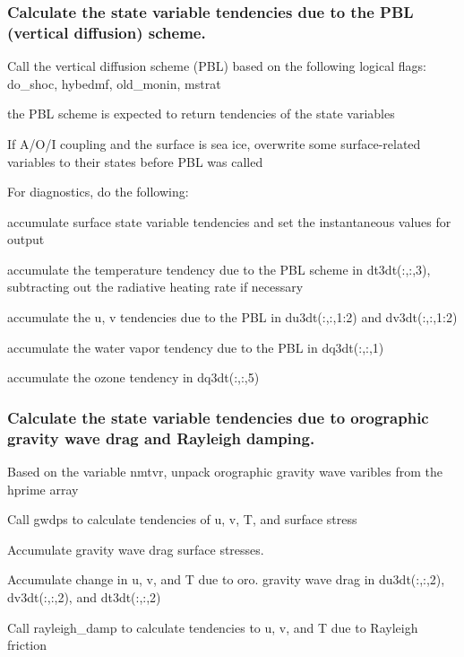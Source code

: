 \subsubsection*{Calculate the state variable tendencies due to the P\+BL (vertical diffusion) scheme.}


\begin{DoxyItemize}
\item Call the vertical diffusion scheme (P\+BL) based on the following logical flags\+: do\+\_\+shoc, hybedmf, old\+\_\+monin, mstrat
\begin{DoxyItemize}
\item the P\+BL scheme is expected to return tendencies of the state variables
\end{DoxyItemize}
\item If A/\+O/I coupling and the surface is sea ice, overwrite some surface-\/related variables to their states before P\+BL was called
\item For diagnostics, do the following\+:
\begin{DoxyItemize}
\item accumulate surface state variable tendencies and set the instantaneous values for output
\item accumulate the temperature tendency due to the P\+BL scheme in dt3dt(\+:,\+:,3), subtracting out the radiative heating rate if necessary
\item accumulate the u, v tendencies due to the P\+BL in du3dt(\+:,\+:,1\+:2) and dv3dt(\+:,\+:,1\+:2)
\item accumulate the water vapor tendency due to the P\+BL in dq3dt(\+:,\+:,1)
\item accumulate the ozone tendency in dq3dt(\+:,\+:,5)
\end{DoxyItemize}
\end{DoxyItemize}

\subsubsection*{Calculate the state variable tendencies due to orographic gravity wave drag and Rayleigh damping.}


\begin{DoxyItemize}
\item Based on the variable nmtvr, unpack orographic gravity wave varibles from the hprime array
\item Call \textquotesingle{}gwdps\textquotesingle{} to calculate tendencies of u, v, T, and surface stress
\item Accumulate gravity wave drag surface stresses.
\item Accumulate change in u, v, and T due to oro. gravity wave drag in du3dt(\+:,\+:,2), dv3dt(\+:,\+:,2), and dt3dt(\+:,\+:,2)
\item Call \textquotesingle{}rayleigh\+\_\+damp\textquotesingle{} to calculate tendencies to u, v, and T due to Rayleigh friction
\end{DoxyItemize}

